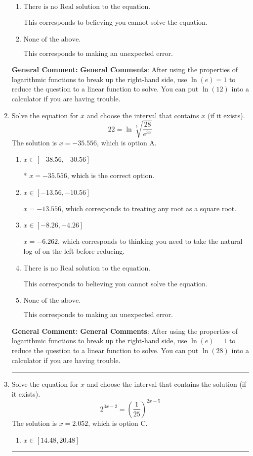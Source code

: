 \documentclass{extbook}[14pt]
\newcommand{\litem}[1]{\item #1

\rule{\textwidth}{0.4pt}}
\begin{document}
\begin{enumerate}
{\begin{enumerate}[label=\Alph*.]
* $x = -2.745$, which is the correct option.
\item \( \text{There is no Real solution to the equation.} \)

This corresponds to believing you cannot solve the equation.
\item \( \text{None of the above.} \)

This corresponds to making an unexpected error.
\end{enumerate}

\textbf{General Comment:} \textbf{General Comments}: After using the properties of logarithmic functions to break up the right-hand side, use $\ln(e) = 1$ to reduce the question to a linear function to solve. You can put $\ln(12)$ into a calculator if you are having trouble.
}
\litem{
 Solve the equation for $x$ and choose the interval that contains $x$ (if it exists).
\[  22 = \ln{\sqrt[5]{\frac{28}{e^{3x}}}} \]The solution is \( x = -35.556 \), which is option A.\begin{enumerate}[label=\Alph*.]
\item \( x \in [-38.56, -30.56] \)

* $x = -35.556$, which is the correct option.
\item \( x \in [-13.56, -10.56] \)

$x = -13.556$, which corresponds to treating any root as a square root.
\item \( x \in [-8.26, -4.26] \)

$x = -6.262$, which corresponds to thinking you need to take the natural log of on the left before reducing.
\item \( \text{There is no Real solution to the equation.} \)

This corresponds to believing you cannot solve the equation.
\item \( \text{None of the above.} \)

This corresponds to making an unexpected error.
\end{enumerate}

\textbf{General Comment:} \textbf{General Comments}: After using the properties of logarithmic functions to break up the right-hand side, use $\ln(e) = 1$ to reduce the question to a linear function to solve. You can put $\ln(28)$ into a calculator if you are having trouble.
}
\litem{
Solve the equation for $x$ and choose the interval that contains the solution (if it exists).
\[ 2^{3x-2} = \left(\frac{1}{25}\right)^{2x-5} \]The solution is \( x = 2.052 \), which is option C.\begin{enumerate}[label=\Alph*.]
\item \( x \in [14.48, 20.48] \)


\end{enumerate}}
\end{enumerate}
\end{document}
